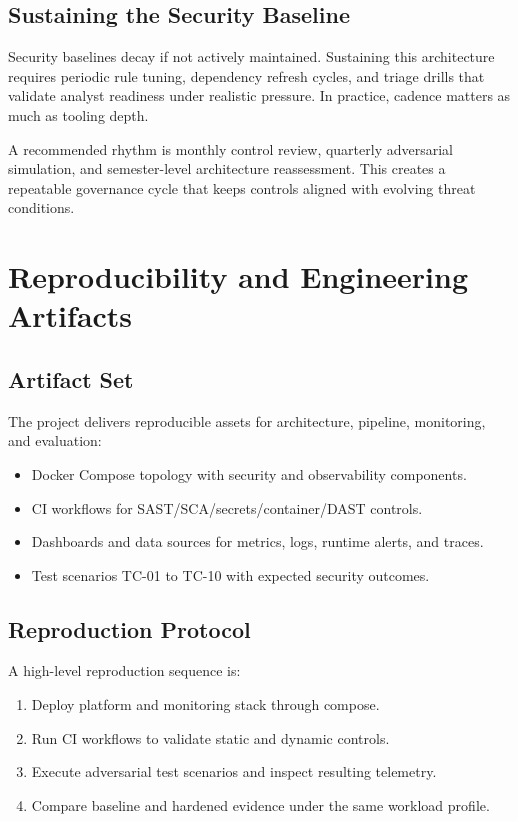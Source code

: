\documentclass[conference]{IEEEtran}
\begin{document}
\subsection{Sustaining the Security Baseline}
Security baselines decay if not actively maintained. Sustaining this architecture requires periodic rule tuning, dependency refresh cycles, and triage drills that validate analyst readiness under realistic pressure. In practice, cadence matters as much as tooling depth.

A recommended rhythm is monthly control review, quarterly adversarial simulation, and semester-level architecture reassessment. This creates a repeatable governance cycle that keeps controls aligned with evolving threat conditions.

\section{Reproducibility and Engineering Artifacts}
\subsection{Artifact Set}
The project delivers reproducible assets for architecture, pipeline, monitoring, and evaluation:
\begin{itemize}
\item Docker Compose topology with security and observability components.
\item CI workflows for SAST/SCA/secrets/container/DAST controls.
\item Dashboards and data sources for metrics, logs, runtime alerts, and traces.
\item Test scenarios TC-01 to TC-10 with expected security outcomes.
\end{itemize}

\subsection{Reproduction Protocol}
A high-level reproduction sequence is:
\begin{enumerate}
\item Deploy platform and monitoring stack through compose.
\item Run CI workflows to validate static and dynamic controls.
\item Execute adversarial test scenarios and inspect resulting telemetry.
\item Compare baseline and hardened evidence under the same workload profile.
\end{enumerate}
\end{document}
